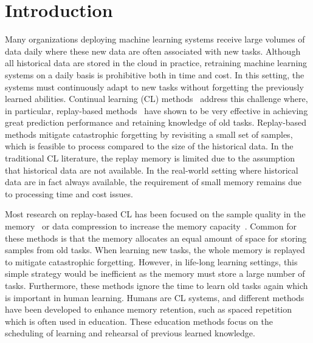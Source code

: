 
\section{Introduction}\label{paperC:sec:introduction}

Many organizations deploying machine learning systems receive large volumes of data daily where these new data are often associated with new tasks. Although all historical data are stored in the cloud in practice, retraining machine learning systems on a daily basis is prohibitive both in time and cost. 
In this setting, the systems must continuously adapt to new tasks without forgetting the previously learned abilities. Continual learning (CL) methods~ 
address this challenge where, in particular, replay-based methods~ have shown to be very effective in achieving great prediction performance and retaining knowledge of old tasks. 
Replay-based methods mitigate catastrophic forgetting by revisiting a small set of samples, which is feasible to process compared to the size of the historical data.
In the traditional CL literature, the replay memory is limited due to the assumption that historical data are not available. In the real-world setting where historical data are in fact always available, the requirement of small memory remains due to processing time and cost issues. %


Most research on replay-based CL has been focused on the sample quality in the memory~ or data compression to increase the memory capacity~. Common for these methods is that the memory allocates an equal amount of space for storing samples from old tasks. When learning new tasks, the whole memory is replayed to mitigate catastrophic forgetting.
However, in life-long learning settings, this simple strategy would be inefficient as the memory must store a large number of tasks. Furthermore, these methods ignore the time to learn old tasks again which is important in human learning. 
Humans are CL systems, and different methods have been developed to enhance memory retention, such as spaced repetition~ which is often used in education. These education methods focus on the scheduling of learning and rehearsal of previous learned knowledge.  


